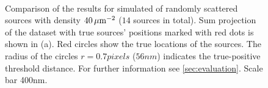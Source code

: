 
\begin{figure}[p]
	\centering
	\newcommand{\sizef}{.95}
	\\
	\caption{Comparison of the results for simulated of randomly scattered sources with density $40\, \mathrm{\mu m}^{-2}$ ($14$ sources in total). Sum projection of the dataset with true sources' positions marked with red dots is shown in (a). Red circles show the true locations of the sources. The radius of the circles $r=0.7\unit{pixels}$ ($56\unit{nm}$) indicates the true-positive threshold distance. For further information see \autoref{sec:evaluation}. Scale bar 400\unit{nm}.}
	\label{fig:comparison density 40}
\end{figure}


